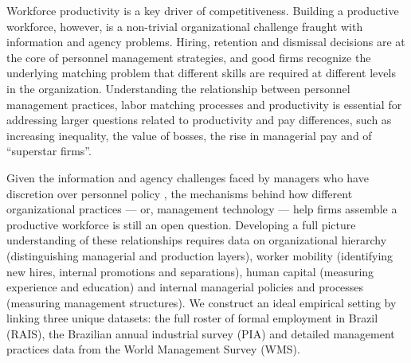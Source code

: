 Workforce productivity is a key driver of competitiveness. Building a productive workforce, however, is a non-trivial organizational challenge fraught with information and agency problems. Hiring, retention and dismissal decisions are at the core of personnel management strategies, and good firms recognize the underlying matching problem that different skills are required at different levels in the organization. Understanding the relationship between personnel management practices, labor matching processes and productivity is essential for addressing larger questions related to productivity and pay differences, such as increasing inequality, the value of bosses, the rise in managerial pay and of ``superstar firms''.  





Given the information and agency challenges faced by managers who have discretion over personnel policy \citep{Hoffman:Discretion:QJE:2018}, the mechanisms behind how different organizational practices --- or, management technology --- help firms assemble a productive workforce is still an open question. Developing a full picture understanding of these relationships requires data on organizational hierarchy (distinguishing managerial and production layers), worker mobility (identifying new hires, internal promotions and separations), human capital (measuring experience and education) and internal managerial policies and processes (measuring management structures). We construct an ideal empirical setting by linking three unique datasets: the full roster of formal employment in Brazil (RAIS), the Brazilian annual industrial survey (PIA) and detailed management practices data from the World Management Survey (WMS). %
 
